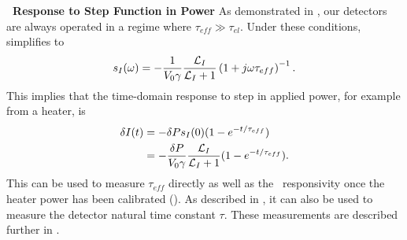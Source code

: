 \textbf{\TES\ Response to Step Function in Power}
As demonstrated in , our detectors are always operated in a regime where $\tau_{eff} \gg \tau_{el}$.
Under these conditions,  simplifies to
\begin{equation} \label{eqn:htr-step-resp-high}
s_I(\omega) = - \dfrac{1}{V_0 \gamma}\dfrac{\mathcal{L}_I}{\mathcal{L}_I + 1}
                       \left(1 + j \omega \tau_{eff}\right)^{-1}.
\end{equation}
This implies that the time-domain response to step in applied power, for example from a heater, is
\begin{align} \label{eqn:htr-step-resp-high-time}
    \delta I(t) & = - \delta P s_I(0) (1 - e^{-t/\tau_{eff}}) \\
                & = - \dfrac{\delta P}{V_0 \gamma}\dfrac{\mathcal{L}_I}{\mathcal{L}_I + 1}
                      (1 - e^{-t/\tau_{eff}}).
\end{align}
This can be used to measure $\tau_{eff}$ directly as well as the \DC\ responsivity once the heater power has been calibrated ().
As described in , it can also be used to measure the detector natural time constant $\tau$.
These measurements are described further in .

